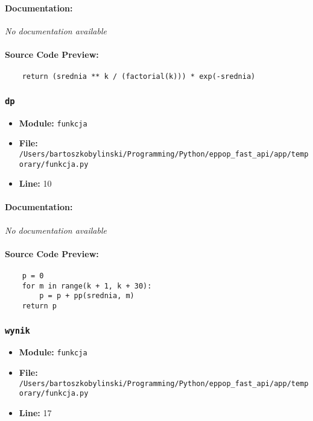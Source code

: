 \documentclass[11pt,a4paper]{article}
\begin{document}
\paragraph{Documentation:} \textit{No documentation available}

\paragraph{Source Code Preview:}
\begin{verbatim}
    return (srednia ** k / (factorial(k))) * exp(-srednia)
\end{verbatim}

\vspace{1em}
\subsubsection{\texttt{dp}}

\begin{itemize}
    \item \textbf{Module:} \texttt{funkcja}
    \item \textbf{File:} \texttt{/Users/bartoszkobylinski/Programming/Python/eppop\_fast\_api/app/temporary/funkcja.py}
    \item \textbf{Line:} 10
\end{itemize}

\paragraph{Documentation:} \textit{No documentation available}

\paragraph{Source Code Preview:}
\begin{verbatim}
    p = 0
    for m in range(k + 1, k + 30):
        p = p + pp(srednia, m)
    return p
\end{verbatim}

\vspace{1em}
\subsubsection{\texttt{wynik}}

\begin{itemize}
    \item \textbf{Module:} \texttt{funkcja}
    \item \textbf{File:} \texttt{/Users/bartoszkobylinski/Programming/Python/eppop\_fast\_api/app/temporary/funkcja.py}
    \item \textbf{Line:} 17
\end{itemize}
\end{document}
